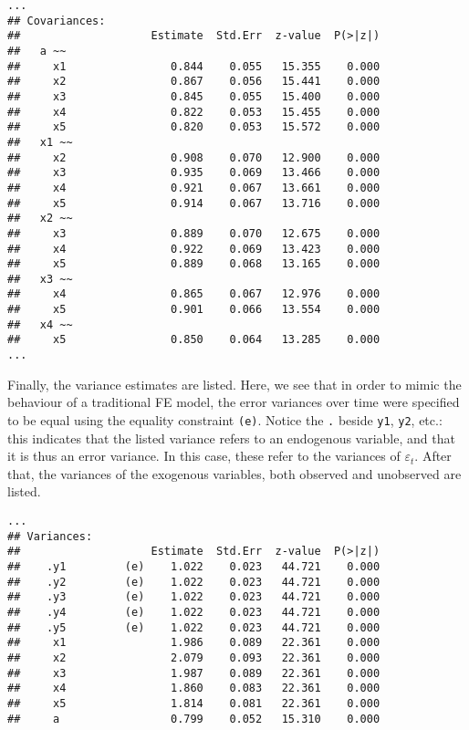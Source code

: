 \documentclass[]{interact}
\theoremstyle{plain}%
\theoremstyle{definition}
\theoremstyle{remark}
\begin{document}
\begin{verbatim}
...
## Covariances:
##                    Estimate  Std.Err  z-value  P(>|z|)
##   a ~~                                                
##     x1                0.844    0.055   15.355    0.000
##     x2                0.867    0.056   15.441    0.000
##     x3                0.845    0.055   15.400    0.000
##     x4                0.822    0.053   15.455    0.000
##     x5                0.820    0.053   15.572    0.000
##   x1 ~~                                               
##     x2                0.908    0.070   12.900    0.000
##     x3                0.935    0.069   13.466    0.000
##     x4                0.921    0.067   13.661    0.000
##     x5                0.914    0.067   13.716    0.000
##   x2 ~~                                               
##     x3                0.889    0.070   12.675    0.000
##     x4                0.922    0.069   13.423    0.000
##     x5                0.889    0.068   13.165    0.000
##   x3 ~~                                               
##     x4                0.865    0.067   12.976    0.000
##     x5                0.901    0.066   13.554    0.000
##   x4 ~~                                               
##     x5                0.850    0.064   13.285    0.000
...
\end{verbatim}

\doublespacing

Finally, the variance estimates are listed. Here, we see that in order
to mimic the behaviour of a traditional FE model, the error variances
over time were specified to be equal using the equality constraint
\texttt{(e)}. Notice the \texttt{.} beside \texttt{y1}, \texttt{y2},
etc.: this indicates that the listed variance refers to an endogenous
variable, and that it is thus an error variance. In this case, these
refer to the variances of \(\varepsilon_{t}\). After that, the variances
of the exogenous variables, both observed and unobserved are listed.

\singlespacing

\begin{verbatim}
...
## Variances:
##                    Estimate  Std.Err  z-value  P(>|z|)
##    .y1         (e)    1.022    0.023   44.721    0.000
##    .y2         (e)    1.022    0.023   44.721    0.000
##    .y3         (e)    1.022    0.023   44.721    0.000
##    .y4         (e)    1.022    0.023   44.721    0.000
##    .y5         (e)    1.022    0.023   44.721    0.000
##     x1                1.986    0.089   22.361    0.000
##     x2                2.079    0.093   22.361    0.000
##     x3                1.987    0.089   22.361    0.000
##     x4                1.860    0.083   22.361    0.000
##     x5                1.814    0.081   22.361    0.000
##     a                 0.799    0.052   15.310    0.000
\end{verbatim}
\end{document}
